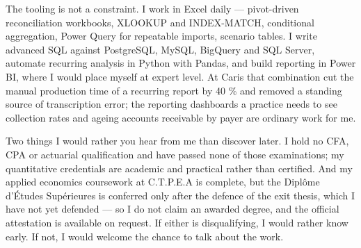 \documentclass[10pt,a4paper,sans]{moderncv}
\begin{document}
The tooling is not a constraint. I work in Excel daily --- pivot-driven reconciliation workbooks, XLOOKUP and INDEX-MATCH, conditional aggregation, Power Query for repeatable imports, scenario tables. I write advanced SQL against PostgreSQL, MySQL, BigQuery and SQL Server, automate recurring analysis in Python with Pandas, and build reporting in Power BI, where I would place myself at expert level. At Caris that combination cut the manual production time of a recurring report by 40 \% and removed a standing source of transcription error; the reporting dashboards a practice needs to see collection rates and ageing accounts receivable by payer are ordinary work for me.

Two things I would rather you hear from me than discover later. I hold no CFA, CPA or actuarial qualification and have passed none of those examinations; my quantitative credentials are academic and practical rather than certified. And my applied economics coursework at C.T.P.E.A is complete, but the Diplôme d'Études Supérieures is conferred only after the defence of the exit thesis, which I have not yet defended --- so I do not claim an awarded degree, and the official attestation is available on request. If either is disqualifying, I would rather know early. If not, I would welcome the chance to talk about the work.

\makeletterclosing
\end{document}
